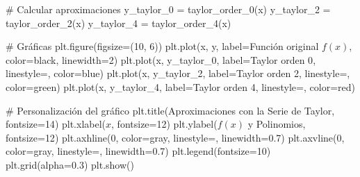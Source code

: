 \documentclass[
  letterpaper,
  DIV=11,
  numbers=noendperiod]{scrartcl}
\newenvironment{Shaded}{\begin{snugshade}}{\end{snugshade}}
\newcommand{\CommentTok}[1]{\textcolor[rgb]{0.37,0.37,0.37}{#1}}
\newcommand{\DecValTok}[1]{\textcolor[rgb]{0.68,0.00,0.00}{#1}}
\newcommand{\FloatTok}[1]{\textcolor[rgb]{0.68,0.00,0.00}{#1}}
\newcommand{\NormalTok}[1]{\textcolor[rgb]{0.00,0.23,0.31}{#1}}
\newcommand{\OperatorTok}[1]{\textcolor[rgb]{0.37,0.37,0.37}{#1}}
\newcommand{\StringTok}[1]{\textcolor[rgb]{0.13,0.47,0.30}{#1}}
\begin{document}
\begin{Shaded}
\begin{Highlighting}[]
\CommentTok{\# Calcular aproximaciones}
\NormalTok{y\_taylor\_0 }\OperatorTok{=}\NormalTok{ taylor\_order\_0(x)}
\NormalTok{y\_taylor\_2 }\OperatorTok{=}\NormalTok{ taylor\_order\_2(x)}
\NormalTok{y\_taylor\_4 }\OperatorTok{=}\NormalTok{ taylor\_order\_4(x)}

\CommentTok{\# Gráficas}
\NormalTok{plt.figure(figsize}\OperatorTok{=}\NormalTok{(}\DecValTok{10}\NormalTok{, }\DecValTok{6}\NormalTok{))}
\NormalTok{plt.plot(x, y, label}\OperatorTok{=}\StringTok{\textquotesingle{}Función original $f(x)$\textquotesingle{}}\NormalTok{, color}\OperatorTok{=}\StringTok{\textquotesingle{}black\textquotesingle{}}\NormalTok{, linewidth}\OperatorTok{=}\DecValTok{2}\NormalTok{)}
\NormalTok{plt.plot(x, y\_taylor\_0, label}\OperatorTok{=}\StringTok{\textquotesingle{}Taylor orden 0\textquotesingle{}}\NormalTok{, linestyle}\OperatorTok{=}\StringTok{\textquotesingle{}{-}{-}\textquotesingle{}}\NormalTok{, color}\OperatorTok{=}\StringTok{\textquotesingle{}blue\textquotesingle{}}\NormalTok{)}
\NormalTok{plt.plot(x, y\_taylor\_2, label}\OperatorTok{=}\StringTok{\textquotesingle{}Taylor orden 2\textquotesingle{}}\NormalTok{, linestyle}\OperatorTok{=}\StringTok{\textquotesingle{}{-}{-}\textquotesingle{}}\NormalTok{, color}\OperatorTok{=}\StringTok{\textquotesingle{}green\textquotesingle{}}\NormalTok{)}
\NormalTok{plt.plot(x, y\_taylor\_4, label}\OperatorTok{=}\StringTok{\textquotesingle{}Taylor orden 4\textquotesingle{}}\NormalTok{, linestyle}\OperatorTok{=}\StringTok{\textquotesingle{}{-}{-}\textquotesingle{}}\NormalTok{, color}\OperatorTok{=}\StringTok{\textquotesingle{}red\textquotesingle{}}\NormalTok{)}

\CommentTok{\# Personalización del gráfico}
\NormalTok{plt.title(}\StringTok{\textquotesingle{}Aproximaciones con la Serie de Taylor\textquotesingle{}}\NormalTok{, fontsize}\OperatorTok{=}\DecValTok{14}\NormalTok{)}
\NormalTok{plt.xlabel(}\StringTok{\textquotesingle{}$x$\textquotesingle{}}\NormalTok{, fontsize}\OperatorTok{=}\DecValTok{12}\NormalTok{)}
\NormalTok{plt.ylabel(}\StringTok{\textquotesingle{}$f(x)$ y Polinomios\textquotesingle{}}\NormalTok{, fontsize}\OperatorTok{=}\DecValTok{12}\NormalTok{)}
\NormalTok{plt.axhline(}\DecValTok{0}\NormalTok{, color}\OperatorTok{=}\StringTok{\textquotesingle{}gray\textquotesingle{}}\NormalTok{, linestyle}\OperatorTok{=}\StringTok{\textquotesingle{}{-}{-}\textquotesingle{}}\NormalTok{, linewidth}\OperatorTok{=}\FloatTok{0.7}\NormalTok{)}
\NormalTok{plt.axvline(}\DecValTok{0}\NormalTok{, color}\OperatorTok{=}\StringTok{\textquotesingle{}gray\textquotesingle{}}\NormalTok{, linestyle}\OperatorTok{=}\StringTok{\textquotesingle{}{-}{-}\textquotesingle{}}\NormalTok{, linewidth}\OperatorTok{=}\FloatTok{0.7}\NormalTok{)}
\NormalTok{plt.legend(fontsize}\OperatorTok{=}\DecValTok{10}\NormalTok{)}
\NormalTok{plt.grid(alpha}\OperatorTok{=}\FloatTok{0.3}\NormalTok{)}
\NormalTok{plt.show()}
\end{Highlighting}
\end{Shaded}
\end{document}
